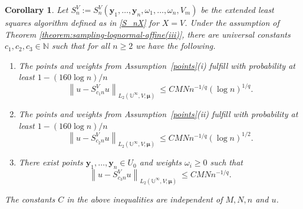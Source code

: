 \documentclass[11pt]{article}
\newtheorem{corollary}{Corollary}[section]
\numberwithin{equation}{section}
\theoremstyle{definition}
\theoremstyle{remark}
\newcommand{\norm}[2]{\left\|{#1}\right\|_{#2}}
\newcommand{\by}{{\boldsymbol{y}}}
\newcommand{\bmu}{{\boldsymbol{\mu}}}
\def\NN{{\mathbb N}}
\def\NN{{\mathbb N}}
\def\UUi{{\mathbb U}^{\infty}}
\def\NN{{\mathbb N}}
\begin{document}
{\begin{corollary}\label{corollary:sampling-lognormal-affine}
	Let 
	$S_{{n}}^V 
	:=
	S_{{n}}^V(\by_1, \dots, \by_{{n}}, \omega_1, \dots, \omega_{{n}}, V_m) $ 
	be the extended least squares algorithm defined as in \eqref{S_nX} for $X=V$.
	Under the assumption  of Theorem \ref{theorem:sampling-lognormal-affine(iii)},
	there are universal constants $c_1, c_2,c_3\in \NN$ such that for all $n \ge 2$ we have the following.
	\begin{enumerate}
		\item[\rm (i)]
        The points and weights from Assumption~\ref{points}{\rm (i)} fulfill with probability at least $1-(160\log n)/n$
		\begin{equation*}
			\norm{u - S_{c_1n}^V u}{L_2(\UUi,V;\bmu)}
			\ \le C MN n^{-1/q} (\log n)^{1/q}.
		\end{equation*}
		\item[\rm (ii)]
        The points and weights from Assumption~\ref{points}{\rm (ii)} fulfill with probability at least $1-(160\log n)/n$
		\begin{equation*}
			\norm{u - S_{c_2n}^V u}{L_2(\UUi,V;\bmu)}
			\ \le C MN n^{- 1/q} (\log n)^{1/2}.
		\end{equation*}	
			\item[\rm (iii)]
        There exist points $\by_1, \dots, \by_n\in U_0$ and weights $\omega_i\ge 0$ such that
		\begin{equation*}
			\norm{u - S_{c_3n}^V u}{L_2(\UUi,V;\bmu)}
			\ \le C MN n^{- 1/q}.
		\end{equation*}	
	\end{enumerate}	 	
	The constants $C$ in the above inequalities are independent of $M,N,n$ and $u$.
\end{corollary}

}
\end{document}
